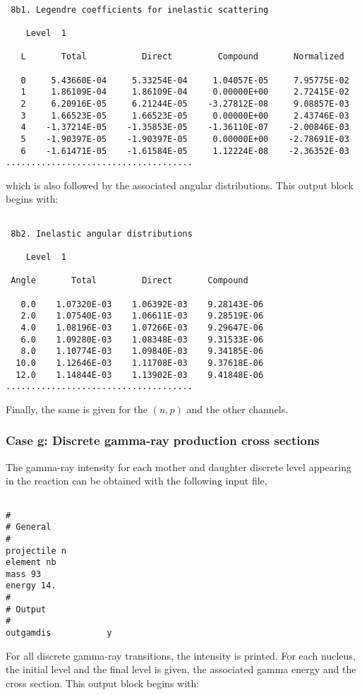 \begin{samplecase}
{\small \begin{verbatim}

 8b1. Legendre coefficients for inelastic scattering
  
    Level  1
  
   L       Total           Direct         Compound       Normalized
  
   0     5.43660E-04     5.33254E-04     1.04057E-05     7.95775E-02
   1     1.86109E-04     1.86109E-04     0.00000E+00     2.72415E-02
   2     6.20916E-05     6.21244E-05    -3.27812E-08     9.08857E-03
   3     1.66523E-05     1.66523E-05     0.00000E+00     2.43746E-03
   4    -1.37214E-05    -1.35853E-05    -1.36110E-07    -2.00846E-03
   5    -1.90397E-05    -1.90397E-05     0.00000E+00    -2.78691E-03
   6    -1.61471E-05    -1.61584E-05     1.12224E-08    -2.36352E-03
.....................................
\end{verbatim} } \renewcommand{\baselinestretch}{1.07}\small\normalsize
\noindent
which is also followed by the associated angular distributions. This output 
block begins with:

{\small \begin{verbatim}

 8b2. Inelastic angular distributions    
   
    Level  1
   
 Angle       Total         Direct       Compound
  
   0.0    1.07320E-03    1.06392E-03    9.28143E-06
   2.0    1.07540E-03    1.06611E-03    9.28519E-06
   4.0    1.08196E-03    1.07266E-03    9.29647E-06
   6.0    1.09280E-03    1.08348E-03    9.31533E-06
   8.0    1.10774E-03    1.09840E-03    9.34185E-06
  10.0    1.12646E-03    1.11708E-03    9.37618E-06
  12.0    1.14844E-03    1.13902E-03    9.41848E-06
.....................................
\end{verbatim} } \renewcommand{\baselinestretch}{1.07}\small\normalsize
\noindent
Finally, the same is given for the $(n,p)$ and the other channels.
\subsubsection{Case g: Discrete gamma-ray production cross sections}
The gamma-ray intensity for each mother and daughter discrete level appearing 
in the reaction can be obtained with the following input file,

{\small \begin{verbatim}

#
# General
#
projectile n
element nb
mass 93
energy 14.
#
# Output
#
outgamdis           y
\end{verbatim} } \renewcommand{\baselinestretch}{1.07}\small\normalsize
\noindent
For all discrete gamma-ray transitions, the intensity is printed.
For each nucleus, the initial level and the final level is given, the 
associated gamma energy and the cross section.
This output block begins with:  


\end{samplecase}
